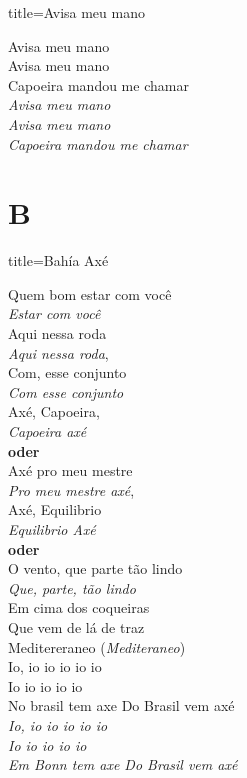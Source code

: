 \documentclass[fontsize=14pt, paper=a4, twoside, DIV=20]{scrreprt} %
\newcommand\chapTOC[1]{
    \chapter*{#1}
    \addcontentsline{toc}{chapter}{#1}
    \markboth{#1}{#1}}
\begin{document}
\begin{multicols*}{2}
\begin{song}{title={Avisa meu mano}}
    \begin{verse*}
       Avisa meu mano  \\
       Avisa meu mano  \\
       Capoeira mandou me chamar \\

       \textit{Avisa meu mano} \\
       \textit{Avisa meu mano} \\
       \textit{Capoeira mandou me chamar}\\
    \end{verse*}
     \end{song}
\newpage
\chapTOC{B}


\begin{song}{title={Bahía Axé}}
    \begin{verse*}
        Quem bom estar com você\\
        \textit{Estar com você}\\
        Aqui nessa roda\\
        \textit{Aqui nessa roda},\\
        Com, esse conjunto\\
        \textit{Com esse conjunto}\\
        Axé, Capoeira, \\
        \textit{Capoeira axé}\\
        \textbf{oder} \\
        Axé pro meu mestre\\
        \textit{Pro meu mestre axé},\\

        Axé, Equilibrio \\
        \textit{Equilibrio Axé} \\
        \textbf{oder} \\
        O vento, que parte tão lindo\\
        \textit{Que, parte, tão lindo}\\
        Em cima dos coqueiras\\
        Que vem de lá de traz\\
        Meditereraneo (\textit{Mediteraneo})\\
        Io, io io io io io\\
        Io io io io io\\
        No brasil tem axe Do Brasil vem axé\\
        \textit{Io, io io io io io}\\
        \textit{Io io io io io}\\
        \textit{Em Bonn tem axe Do Brasil vem axé}\\


\end{verse*}
\end{song}
\end{multicols*}
\end{document}
